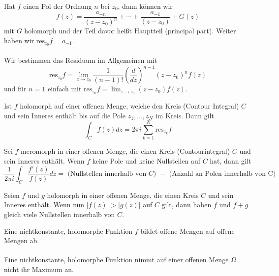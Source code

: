 \documentclass[11pt]{article}
\newenvironment{problem}[1]{
    \begin{trivlist}
        \item[\hskip \labelsep {\bfseries #1}] }{
    \end{trivlist}\normalshape
}
\begin{document}
    \begin{problem}{Residuum}
        Hat $f$ einen Pol der Ordnung $n$ bei $z_0$, dann können wir
        $$f(z)=\frac{a_{-n}}{(z-z_0)^n}+\cdots + \frac{a_{-1}}{(z-z_0)}+G(z)$$
        mit $G$ holomorph und der Teil davor heißt Hauptteil (principal part). Weiter haben wir
        $\text{res}_{z_0} f=a_{-1}$. \\\\
        Wir bestimmen das Residuum im Allgemeinen mit
        $$\text{res}_{z_0} f=\lim_{z\to z_0}\frac{1}{(n-1)!}\left(\frac{d}{dz}\right)^{n-1}(z-z_0)^n f(z)$$
        und für $n=1$ einfach mit $\text{res}_{z_0} f=\lim_{z\to z_0}(z-z_0)f(z)$.
    \end{problem}

    \begin{problem}{Residuen Formel}
        Ist $f$ holomorph auf einer offenen Menge, welche den Kreis (Contour Integral) $C$ und sein Inneres
        enthält bis auf die Pole $z_1,\dots, z_N$ im Kreis. Dann gilt
        $$\int_C f(z)dz = 2\pi i\sum_{k=1}^N \text{res}_{z_k} f$$
    \end{problem}
    
    \begin{problem}{Argument principle}
        Sei $f$ meromorph in einer offenen Menge, die einen Kreis (Contourintegral)
        $C$ und sein Inneres enthält. Wenn $f$ keine Pole und keine Nullstellen
        auf $C$ hat, dann gilt 
        $$\frac{1}{2\pi i}\int_C \frac{f'(z)}{f(z)}dz=\text{ (Nullstellen innerhalb
            von $C$) } - \text{ (Anzahl an Polen innerhalb von C)}$$
    \end{problem}

    \begin{problem}{Rouché's Theorem}
        Seien $f$ und $g$ holomorph in einer offenen Menge, die einen Kreis $C$
        und sein Inneres enthält. Wenn nun $|f(z)|>|g(z)|$ auf $C$ gilt,
        dann haben $f$ und $f+g$ gleich viele Nullstellen innerhalb von $C$.
    \end{problem}

    \begin{problem}{Folgerungen}
        Eine nichtkonstante, holomorphe Funktion $f$ bildet offene Mengen
        auf offene Mengen ab. \\\\
        Eine nichtkonstante, holomorphe Funktion nimmt auf einer offenen Menge
        $\Omega$ nicht ihr Maximum an.
    \end{problem}
\end{document}
